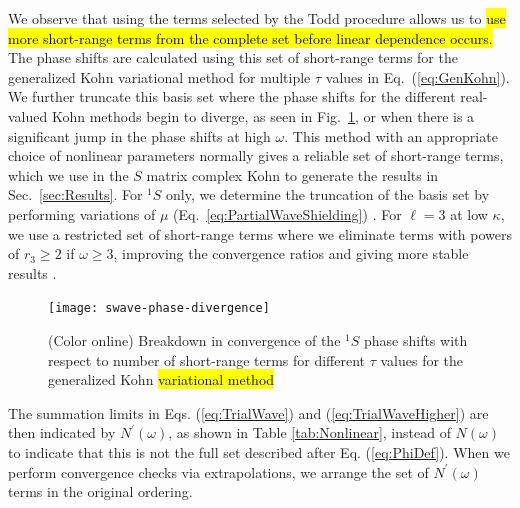 \documentclass[preprint,showpacs,showkeys,preprintnumbers,amsmath,amssymb,longbibliography,pra,aps]{revtex4-1}
\newcommand{\todoi}{\todo[inline]}
\begin{document}
{We observe that using the terms selected by the Todd procedure allows us to
\hl{use more short-range terms from the complete set before linear dependence occurs.}
The phase shifts are calculated using this set of short-range terms for the 
generalized Kohn variational method for multiple $\tau$ values in
Eq.~(\ref{eq:GenKohn}). We further truncate this basis set where the phase
shifts for the different real-valued Kohn methods begin to diverge, as seen in
Fig.~\ref{fig:swave-phase-divergence}, or when there is a significant jump in
the phase shifts at high $\omega$. This method with an appropriate choice of
nonlinear parameters normally gives a reliable set of
short-range terms, which we use in the $S$ matrix complex Kohn to generate
the results in Sec.~\ref{sec:Results}. For $^1S$ only, we determine
the truncation of the basis set by performing variations of $\mu$
(Eq.~\ref{eq:PartialWaveShielding}) \cite{WoodsDiss2015}.
For $\ell = 3$ at low $\kappa$, we use a restricted set of short-range terms
where we eliminate terms with powers of $r_3 \geq 2$ if $\omega \geq 3$,
improving the convergence ratios and giving more stable results
\cite{VanReeth2003,WoodsDiss2015}.
\begin{figure}[H]
	\centering
	\texttt{[image: swave-phase-divergence]}
	\caption{(Color online) Breakdown in convergence of the $^1S$ phase
shifts with respect to number of short-range terms for different $\tau$
values for the generalized Kohn \hl{variational method}}
	\label{fig:swave-phase-divergence}
\end{figure}

The summation limits in Eqs. (\ref{eq:TrialWave}) and
(\ref{eq:TrialWaveHigher}) are then indicated by $N^\prime(\omega)$,
as shown in Table \ref{tab:Nonlinear}, instead of
$N(\omega)$ to indicate that this is not the full set described after
Eq. (\ref{eq:PhiDef}).
When we perform convergence checks via extrapolations, we
arrange the set of $N^\prime(\omega)$ terms in the original ordering.

}
\end{document}
